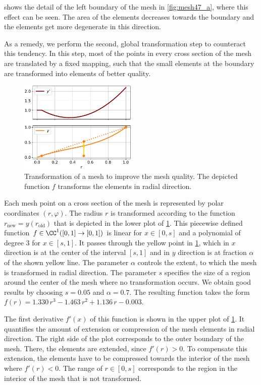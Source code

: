  shows the detail of the left boundary of the mesh in \cref{fig:mesh47_a}, where this effect can be seen. The area of the elements decreases towards the boundary and the elements get more degenerate in this direction.

As a remedy, we perform the second, global transformation step to counteract this tendency. In this step, most of the points in every cross section of the mesh are translated by a fixed mapping, such that the small elements at the boundary are transformed into elements of better quality.

\begin{figure}
  \centering%
  \includegraphics[width=0.5\textwidth]{images/parallel_fiber_estimation/extend_mesh_plot.pdf}%
  \caption{Transformation of a mesh to improve the mesh quality. The depicted function $f$ transforms the elements in radial direction.}%
  \label{fig:extend_mesh_plot}%
\end{figure}%

Each mesh point on a cross section of the mesh is represented by polar coordinates $(r,\varphi)$. The radius $r$ is transformed according to the function $r_\text{new} = y(r_\text{old})$ that is depicted in the lower plot of \cref{fig:extend_mesh_plot}. This piecewise defined function $f\in \CC^1([0,1]\to [0,1])$ is linear for $x\in [0,s]$ and a polynomial of degree 3 for $x \in [s,1]$. It passes through the yellow point in \cref{fig:extend_mesh_plot}, which in $x$ direction is at the center of the interval $[s,1]$ and in $y$ direction is at fraction $\alpha$ of the shown yellow line.
The parameter $\alpha$ controls the extent, to which the mesh is transformed in radial direction. The parameter $s$ specifies the size of a region around the center of the mesh where no transformation occurs. We obtain good results by choosing $s=0.05$ and $\alpha=0.7$. The resulting function takes the form $f(r) = 1.330\,r^3 - 1.463\,r^2 + 1.136\,r - 0.003$.

The first derivative $f'(x)$ of this function is shown in the upper plot of \cref{fig:extend_mesh_plot}. It quantifies the amount of extension or compression of the mesh elements in radial direction. The right side of the plot corresponds to the outer boundary of the mesh. There, the elements are extended, since $f'(r) > 0$. To compensate this extension, the elements have to be compressed towards the interior of the mesh  where $f'(r) < 0$. The range of $r \in [0,s]$ corresponds to the region in the interior of the mesh that is not transformed.

